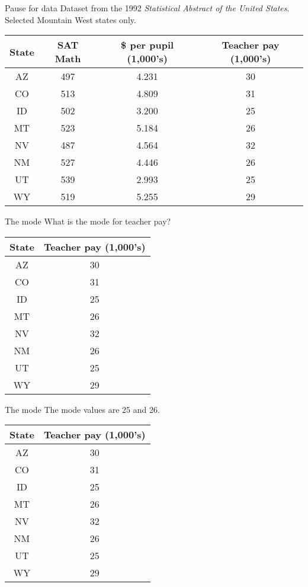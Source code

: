 \documentclass[xcolor=dvipsnames]{beamer}
\begin{document}
\begin{frame}{Pause for data}
Dataset from the 1992 \emph{Statistical Abstract of the United States}. Selected Mountain West states only.
	\begin{center}
			\begin{tabular}{|c|c|c|c|}
			\hline 
			\textbf{State} & \textbf{SAT Math} & \textbf{\$ per pupil (1,000's)} & \textbf{Teacher pay (1,000's)} \\ 
			\hline \hline
			AZ & 497  & 4.231 & 30 \\ \hline 
			CO & 513  & 4.809 & 31 \\ \hline 
			ID & 502  & 3.200 & 25  \\  \hline 
			MT & 523  & 5.184 & 26 \\ \hline 
			NV & 487  & 4.564 & 32 \\ \hline 
			NM & 527  & 4.446 & 26 \\ \hline 
			UT & 539  & 2.993 & 25 \\ \hline 
			WY & 519  & 5.255 & 29 \\ \hline 
		\end{tabular} 
	\end{center}
\end{frame}

\begin{frame}{The mode}
What is the mode for teacher pay?
	\begin{center}
	\begin{tabular}{|c|c|}
		\hline 
		\textbf{State} & \textbf{Teacher pay (1,000's)} \\ 
		\hline \hline
		AZ & 30 \\ \hline 
		CO &  31 \\ \hline 
		ID & 25  \\  \hline 
		MT &  26 \\ \hline 
		NV & 32 \\ \hline 
		NM &  26 \\ \hline 
		UT &  25 \\ \hline 
		WY &  29 \\ \hline 
	\end{tabular} 
\end{center}
\end{frame}

\begin{frame}{The mode}
	The mode values are 25 and 26.
	\begin{center}
		\begin{tabular}{|c|c|}
			\hline 
			\textbf{State} & \textbf{Teacher pay (1,000's)} \\ 
			\hline \hline
			AZ & 30 \\ \hline 
			CO &  31 \\ \hline 
			ID & 25  \\  \hline 
			MT &  26 \\ \hline 
			NV & 32 \\ \hline 
			NM &  26 \\ \hline 
			UT &  25 \\ \hline 
			WY &  29 \\ \hline 
		\end{tabular} 
	\end{center}
\end{frame}
\end{document}
